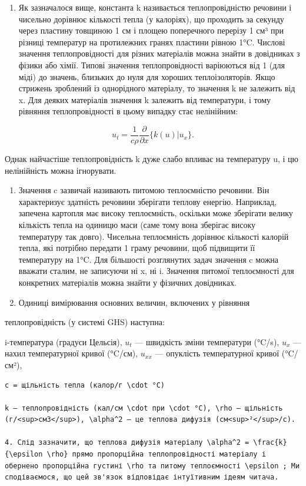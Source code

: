\documentclass[
  ukrainian,
]{article}
\providecommand{\tightlist}{%
  \setlength{\itemsep}{0pt}\setlength{\parskip}{0pt}}
\begin{document}
\begin{enumerate}
\def\labelenumi{\arabic{enumi}.}
\tightlist
\item
  Як зазначалося вище, константа k називається теплопровідністю речовини
  і чисельно дорівнює кількості тепла (у калоріях), що проходить за
  секунду через пластину товщиною 1 см і площею поперечного перерізу 1
  см³ при різниці температур на протилежних гранях пластини рівною 1°C.
  Числові значення теплопровідності для різних матеріалів можна знайти в
  довідниках з фізики або хімії. Типові значення теплопровідності
  варіюються від 1 (для міді) до значень, близьких до нуля для хороших
  теплоізоляторів. Якщо стрижень зроблений із однорідного матеріалу, то
  значення k не залежить від x. Для деяких матеріалів значення k
  залежить від температури, і тому рівняння теплопровідності в цьому
  випадку стає нелінійним:
\end{enumerate}

\[
u_{t} = \frac{1}{c\rho} \frac{\partial}{\partial x} \{ k (u) | u_{x} \}.
\]

Однак найчастіше теплопровідність k дуже слабо впливає на температуру u,
і цю нелінійність можна ігнорувати.

\begin{enumerate}
\def\labelenumi{\arabic{enumi}.}
\setcounter{enumi}{1}
\item
  Значення c зазвичай називають питомою теплоємністю речовини. Він
  характеризує здатність речовини зберігати теплову енергію. Наприклад,
  запечена картопля має високу теплоємність, оскільки може зберігати
  велику кількість тепла на одиницю маси (саме тому вона зберігає високу
  температуру так довго). Чисельна теплоємність дорівнює кількості
  калорій тепла, які потрібно передати 1 граму речовини, щоб підвищити
  її температуру на 1°C. Для більшості розглянутих задач значення c
  можна вважати сталим, не записуючи ні x, ні i. Значення питомої
  теплоємності для конкретних матеріалів можна знайти у фізичних
  довідниках.
\item
  Одиниці вимірювання основних величин, включених у рівняння
\end{enumerate}

теплопровідність (у системі GHS) наступна:

i-температура (градуси Цельсія), \(u_t\) --- швидкість зміни температури
(°C/s), \(u_x\) --- нахил температурної кривої (°C/см), \(u_{xx}\) ---
опуклість температурної кривої (°C/см²),

\begin{verbatim}
c = щільність тепла (калор/г \cdot °C)

k — теплопровідність (кал/см \cdot при \cdot °C), \rho — щільність (г/<sup>см3</sup>), \alpha^2 — це теплова дифузія (см<sup>²</sup>/с).

4. Слід зазначити, що теплова дифузія матеріалу \alpha^2 = \frac{k}{\epsilon \rho} прямо пропорційна теплопровідності матеріалу і обернено пропорційна густині \rho та питому теплоємності \epsilon ; Ми сподіваємося, що цей зв'язок відповідає інтуїтивним ідеям читача.
\end{verbatim}
\end{document}
